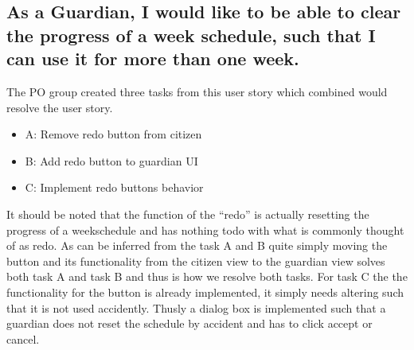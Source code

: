 \subsection{As a Guardian, I would like to be able to clear the progress of a week schedule, such that I can use it for more than one week.}
The PO group created three tasks from this user story which combined would resolve the user story.
\begin{itemize}
    \item A: Remove redo button from citizen
    \item B: Add redo button to guardian UI
    \item C: Implement redo buttons behavior
\end{itemize}
It should be noted that the function of the \enquote{redo} is actually resetting the progress of a weekschedule and has nothing todo with what is commonly thought of as redo.
As can be inferred from the task A and B quite simply moving the button and its functionality from the citizen view to the guardian view solves both task A and task B and thus is how we resolve both tasks.
For task C the the functionality for the button is already implemented, it simply needs altering such that it is not used accidently.
Thusly a dialog box is implemented such that a guardian does not reset the schedule by accident and has to click accept or cancel.